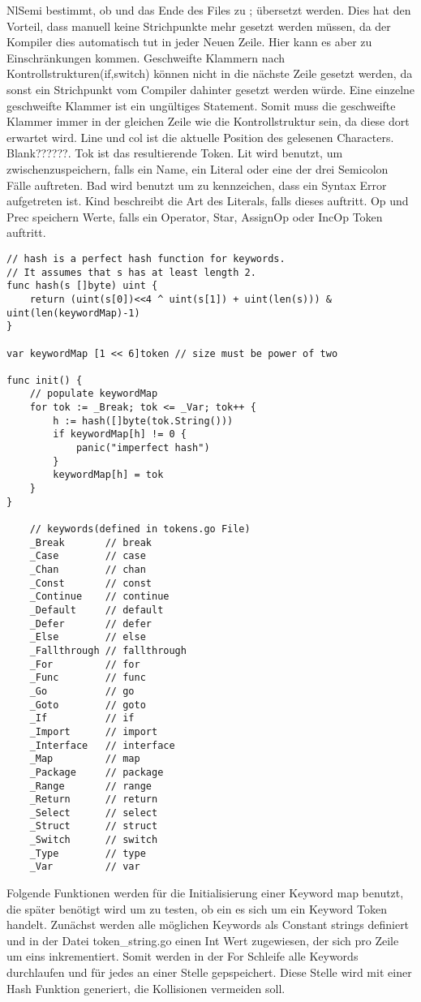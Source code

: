 NlSemi bestimmt, ob  und das Ende des Files zu ; übersetzt werden. Dies hat den Vorteil, dass manuell keine Strichpunkte mehr gesetzt werden müssen, da der Kompiler dies automatisch tut in jeder Neuen Zeile. Hier kann es aber zu Einschränkungen kommen. Geschweifte Klammern nach Kontrollstrukturen(if,switch) können nicht in die nächste Zeile gesetzt werden, da sonst ein Strichpunkt vom Compiler dahinter gesetzt werden würde. Eine einzelne geschweifte Klammer ist ein ungültiges Statement. Somit muss die geschweifte Klammer immer in der gleichen Zeile wie die Kontrollstruktur sein, da diese dort erwartet wird. 
Line und col ist die aktuelle Position des gelesenen Characters. Blank??????. Tok ist das resultierende Token. Lit wird benutzt, um zwischenzuspeichern, falls ein Name, ein Literal oder eine der drei Semicolon Fälle auftreten. Bad wird benutzt um zu kennzeichen, dass ein Syntax Error aufgetreten ist. Kind beschreibt die Art des Literals, falls dieses auftritt. Op und Prec speichern Werte, falls ein Operator, Star, AssignOp oder IncOp Token auftritt.

\begin{lstlisting}
// hash is a perfect hash function for keywords.
// It assumes that s has at least length 2.
func hash(s []byte) uint {
	return (uint(s[0])<<4 ^ uint(s[1]) + uint(len(s))) & uint(len(keywordMap)-1)
}

var keywordMap [1 << 6]token // size must be power of two

func init() {
	// populate keywordMap
	for tok := _Break; tok <= _Var; tok++ {
		h := hash([]byte(tok.String()))
		if keywordMap[h] != 0 {
			panic("imperfect hash")
		}
		keywordMap[h] = tok
	}
}

	// keywords(defined in tokens.go File)
	_Break       // break
	_Case        // case
	_Chan        // chan
	_Const       // const
	_Continue    // continue
	_Default     // default
	_Defer       // defer
	_Else        // else
	_Fallthrough // fallthrough
	_For         // for
	_Func        // func
	_Go          // go
	_Goto        // goto
	_If          // if
	_Import      // import
	_Interface   // interface
	_Map         // map
	_Package     // package
	_Range       // range
	_Return      // return
	_Select      // select
	_Struct      // struct
	_Switch      // switch
	_Type        // type
	_Var         // var
\end{lstlisting}
Folgende Funktionen werden für die Initialisierung einer Keyword map benutzt, die später benötigt wird um zu testen, ob ein es sich um ein Keyword Token handelt. Zunächst werden alle möglichen Keywords als Constant strings definiert und in der Datei token\_string.go einen Int Wert zugewiesen, der sich pro Zeile um eins inkrementiert. Somit werden in der For Schleife alle Keywords durchlaufen und für jedes an einer Stelle gepspeichert. Diese Stelle wird mit einer Hash Funktion generiert, die Kollisionen vermeiden soll.

